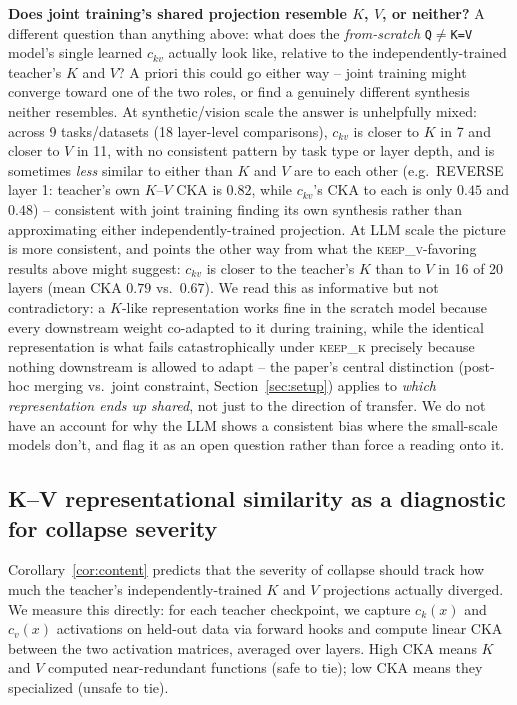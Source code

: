 \documentclass[11pt]{article}
\begin{document}
\textbf{Does joint training's shared projection resemble $K$, $V$, or neither?}
A different question than anything above: what does the \emph{from-scratch}
\texttt{Q}$\neq$\texttt{K=V} model's single learned $c_{kv}$ actually look like,
relative to the independently-trained teacher's $K$ and $V$? A priori this could go
either way -- joint training might converge toward one of the two roles, or find a
genuinely different synthesis neither resembles. At synthetic/vision scale the answer
is unhelpfully mixed: across 9 tasks/datasets (18 layer-level comparisons), $c_{kv}$
is closer to $K$ in 7 and closer to $V$ in 11, with no consistent pattern by task type
or layer depth, and is sometimes \emph{less} similar to either than $K$ and $V$ are to
each other (e.g.\ REVERSE layer 1: teacher's own $K$--$V$ CKA is $0.82$, while
$c_{kv}$'s CKA to each is only $0.45$ and $0.48$) -- consistent with joint training
finding its own synthesis rather than approximating either independently-trained
projection. At LLM scale the picture is more consistent, and points the other way
from what the \textsc{keep\_v}-favoring results above might suggest: $c_{kv}$ is
closer to the teacher's $K$ than to $V$ in 16 of 20 layers (mean CKA $0.79$ vs.\
$0.67$). We read this as informative but not contradictory: a $K$-like representation
works fine in the scratch model because every downstream weight co-adapted to it
during training, while the identical representation is what fails catastrophically
under \textsc{keep\_k} precisely because nothing downstream is allowed to adapt --
the paper's central distinction (post-hoc merging vs.\ joint constraint,
Section~\ref{sec:setup}) applies to \emph{which representation ends up shared}, not
just to the direction of transfer. We do not have an account for why the LLM shows a
consistent bias where the small-scale models don't, and flag it as an open question
rather than force a reading onto it.

\subsection{K--V representational similarity as a diagnostic for collapse severity}

Corollary~\ref{cor:content} predicts that the severity of collapse should track how
much the teacher's independently-trained $K$ and $V$ projections actually diverged.
We measure this directly: for each teacher checkpoint, we capture $c_k(x)$ and
$c_v(x)$ activations on held-out data via forward hooks and compute linear CKA
\cite{kornblith2019similarity} between the two activation matrices, averaged over
layers. High CKA means $K$ and $V$ computed near-redundant functions (safe to tie);
low CKA means they specialized (unsafe to tie).
\end{document}
